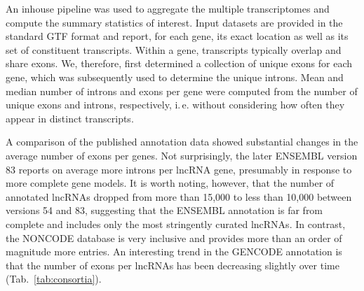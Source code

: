 \documentclass[ncrna,article,submit,moreauthors,pdftex,10pt,a4paper]{mdpi}
\begin{document}
An inhouse pipeline was used to aggregate the
multiple transcriptomes and compute the summary statistics of
interest. Input datasets are provided in the standard GTF format and
report, for each gene, its exact location as well as its set of constituent
transcripts. Within a gene, transcripts typically overlap and share exons.
We, therefore, first determined a collection of unique exons for each gene,
which was subsequently used to determine the unique introns. Mean and
median number of introns and exons per gene were computed from the number
of unique exons and introns, respectively, i.\,e. without considering how often
they appear in distinct transcripts.

A comparison of the published annotation data showed substantial changes in
the average number of exons per genes. Not surprisingly, the later ENSEMBL
version 83 reports on average more introns per lncRNA gene, presumably in
response to more complete gene models. It is worth noting, however, that
the number of annotated lncRNAs dropped from more than 15,000 to less than
10,000 between versions 54 and 83, suggesting that the ENSEMBL annotation
is far from complete and includes only the most stringently curated
lncRNAs. In contrast, the NONCODE database is very inclusive and provides
more than an order of magnitude more entries. An interesting trend in the
GENCODE annotation is that the number of exons per lncRNAs has been
decreasing slightly over time (Tab.~\ref{tab:consortia}).

\vspace{6pt} 








\end{document}
